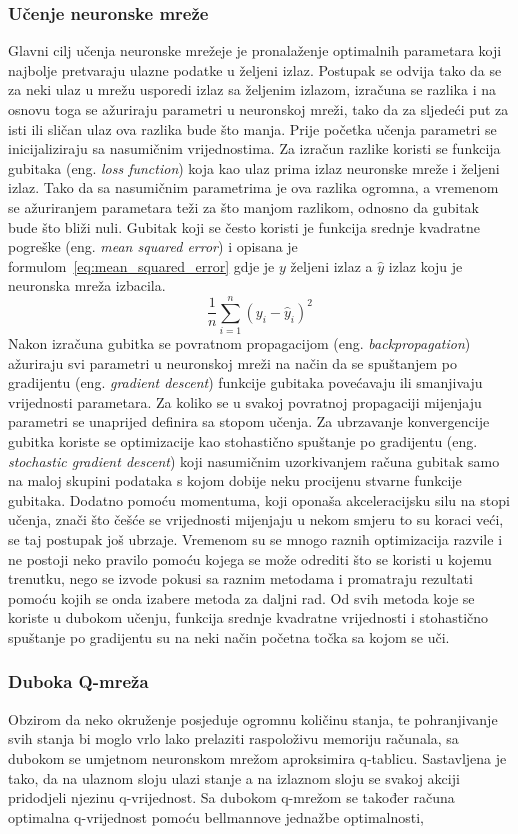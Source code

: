 \subsubsection{Učenje neuronske mreže}
Glavni cilj učenja neuronske mrežeje je pronalaženje optimalnih parametara koji najbolje pretvaraju ulazne podatke u željeni izlaz. Postupak se odvija tako da se za neki ulaz u mrežu usporedi izlaz sa željenim izlazom, izračuna se razlika i na osnovu toga se ažuriraju parametri u neuronskoj mreži, tako da za sljedeći put za isti ili sličan ulaz ova razlika bude što manja. Prije početka učenja parametri se inicijaliziraju sa nasumičnim vrijednostima. Za izračun razlike koristi se funkcija gubitaka (eng. \textit{loss function}) koja kao ulaz prima izlaz neuronske mreže i željeni izlaz. Tako da sa nasumičnim parametrima je ova razlika ogromna, a vremenom se ažuriranjem parametara teži za što manjom razlikom, odnosno da gubitak bude što bliži nuli. Gubitak koji se često koristi je funkcija srednje kvadratne pogreške (eng. \textit{mean squared error}) i opisana je formulom~\ref{eq:mean_squared_error} gdje je $y$ željeni izlaz a $\hat{y}$ izlaz koju je neuronska mreža izbacila. 
\begin{equation}\label{eq:mean_squared_error}
\frac{1}{n}\sum_{i=1}^{n}(y_i - \hat{y}_i)^2
\end{equation}
Nakon izračuna gubitka se povratnom propagacijom (eng. \textit{backpropagation}) ažuriraju svi parametri u neuronskoj mreži na način da se spuštanjem po gradijentu (eng. \textit{gradient descent}) funkcije gubitaka povećavaju ili smanjivaju vrijednosti parametara. Za koliko se u svakoj povratnoj propagaciji mijenjaju parametri se unaprijed definira sa stopom učenja. Za ubrzavanje konvergencije gubitka koriste se optimizacije kao stohastično spuštanje po gradijentu (eng. \textit{stochastic gradient descent}) koji nasumičnim uzorkivanjem računa gubitak samo na maloj skupini podataka s kojom dobije neku procijenu stvarne funkcije gubitaka. Dodatno pomoću momentuma, koji oponaša akceleracijsku silu na stopi učenja, znači što češće se vrijednosti mijenjaju u nekom smjeru to su koraci veći, se taj postupak još ubrzaje. Vremenom su se mnogo raznih optimizacija razvile i ne postoji neko pravilo pomoću kojega se može odrediti što se koristi u kojemu trenutku, nego se izvode pokusi sa raznim metodama i promatraju rezultati pomoću kojih se onda izabere metoda za daljni rad. Od svih metoda koje se koriste u dubokom učenju, funkcija srednje kvadratne vrijednosti i stohastično spuštanje po gradijentu su na neki način početna točka sa kojom se uči.

\subsubsection{Duboka Q-mreža}
Obzirom da neko okruženje posjeduje ogromnu količinu stanja, te pohranjivanje svih stanja bi moglo vrlo lako prelaziti raspoloživu memoriju računala, sa dubokom se umjetnom neuronskom mrežom aproksimira q-tablicu. Sastavljena je tako, da na ulaznom sloju ulazi stanje a na izlaznom sloju se svakoj akciji pridodjeli njezinu q-vrijednost. Sa dubokom q-mrežom se također računa optimalna q-vrijednost pomoću bellmannove jednažbe optimalnosti, 
